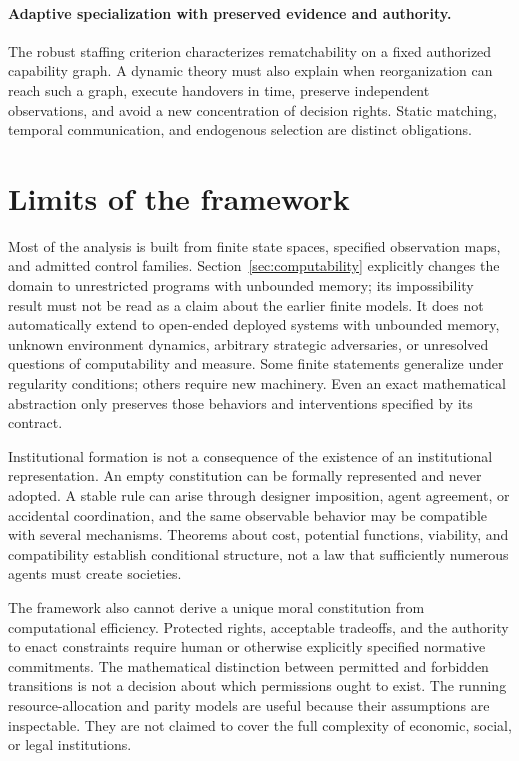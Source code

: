 \documentclass[11pt,letterpaper]{article}
\theoremstyle{plain}
\theoremstyle{definition}
\theoremstyle{remark}
\begin{document}
\paragraph{Adaptive specialization with preserved evidence and authority.}
The robust staffing criterion characterizes rematchability on a fixed authorized capability graph. A dynamic theory must also explain when reorganization can reach such a graph, execute handovers in time, preserve independent observations, and avoid a new concentration of decision rights. Static matching, temporal communication, and endogenous selection are distinct obligations.

\section{Limits of the framework}\label{sec:limits}

Most of the analysis is built from finite state spaces, specified observation maps, and admitted control families. Section~\ref{sec:computability} explicitly changes the domain to unrestricted programs with unbounded memory; its impossibility result must not be read as a claim about the earlier finite models. It does not automatically extend to open-ended deployed systems with unbounded memory, unknown environment dynamics, arbitrary strategic adversaries, or unresolved questions of computability and measure. Some finite statements generalize under regularity conditions; others require new machinery. Even an exact mathematical abstraction only preserves those behaviors and interventions specified by its contract.

Institutional formation is not a consequence of the existence of an institutional representation. An empty constitution can be formally represented and never adopted. A stable rule can arise through designer imposition, agent agreement, or accidental coordination, and the same observable behavior may be compatible with several mechanisms. Theorems about cost, potential functions, viability, and compatibility establish conditional structure, not a law that sufficiently numerous agents must create societies.

The framework also cannot derive a unique moral constitution from computational efficiency. Protected rights, acceptable tradeoffs, and the authority to enact constraints require human or otherwise explicitly specified normative commitments. The mathematical distinction between permitted and forbidden transitions is not a decision about which permissions ought to exist. The running resource-allocation and parity models are useful because their assumptions are inspectable. They are not claimed to cover the full complexity of economic, social, or legal institutions.
\end{document}
